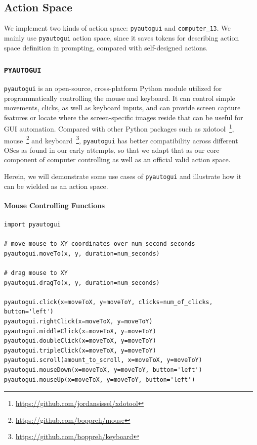\subsection{Action Space}
\label{app:action_space}
We implement two kinds of action space: 
\texttt{pyautogui} and \texttt{computer\_13}.
We mainly use \texttt{pyautogui} action space, since it saves tokens for describing action space definition in prompting, compared with self-designed actions.

\subsubsection{\texttt{PYAUTOGUI}}
\texttt{pyautogui} is an open-source, cross-platform Python module utilized for programmatically controlling the mouse and keyboard. 
It can control simple movements, clicks, as well as keyboard inputs, and can provide screen capture features or locate where the screen-specific images reside that can be useful for GUI automation. 
Compared with other Python packages such as xdotool~\footnote{\url{https://github.com/jordansissel/xdotool}}, mouse~\footnote{\url{https://github.com/boppreh/mouse}} and keyboard~\footnote{\url{https://github.com/boppreh/keyboard}}, \texttt{pyautogui} has better compatibility across different OSes as found in our early attempts, so that we adapt that as our core component of computer controlling as well as an official valid action space.

Herein, we will demonstrate some use cases of \texttt{pyautogui} and illustrate how it can be wielded as an action space.

\paragraph{Mouse Controlling Functions}
\small
\begin{Verbatim}
import pyautogui

# move mouse to XY coordinates over num_second seconds
pyautogui.moveTo(x, y, duration=num_seconds)

# drag mouse to XY
pyautogui.dragTo(x, y, duration=num_seconds)

pyautogui.click(x=moveToX, y=moveToY, clicks=num_of_clicks, button='left')
pyautogui.rightClick(x=moveToX, y=moveToY)
pyautogui.middleClick(x=moveToX, y=moveToY)
pyautogui.doubleClick(x=moveToX, y=moveToY)
pyautogui.tripleClick(x=moveToX, y=moveToY)
pyautogui.scroll(amount_to_scroll, x=moveToX, y=moveToY)
pyautogui.mouseDown(x=moveToX, y=moveToY, button='left')
pyautogui.mouseUp(x=moveToX, y=moveToY, button='left')
\end{Verbatim}

